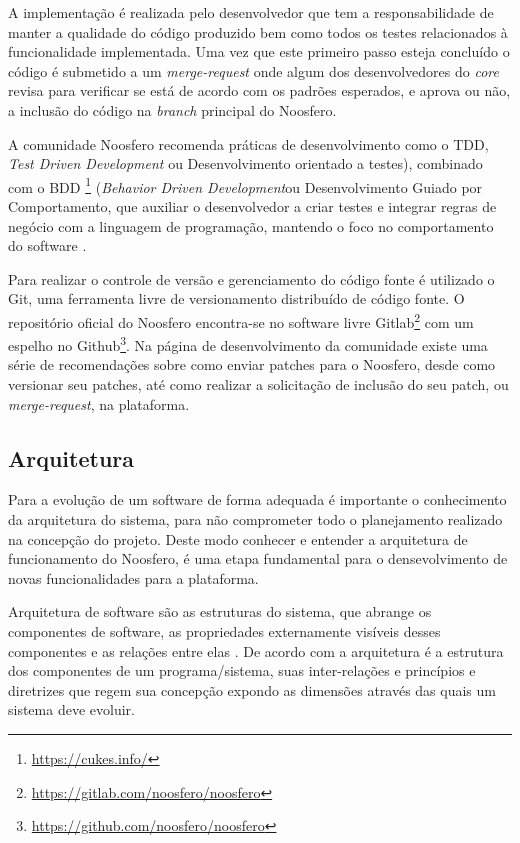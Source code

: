 A implementação é realizada pelo desenvolvedor que tem a responsabilidade de manter a qualidade do código produzido bem como todos os testes relacionados à funcionalidade implementada. Uma vez que este primeiro passo esteja concluído o código é submetido a um \textit{merge-request} onde algum dos desenvolvedores do \textit{core} revisa para verificar se está de acordo com os padrões esperados, e aprova ou não, a inclusão do código na \textit{branch} principal do Noosfero.

A comunidade Noosfero recomenda práticas de desenvolvimento como o TDD, \textit{Test Driven Development} ou Desenvolvimento orientado a testes), combinado com o BDD \footnote{\url{https://cukes.info/}} (\textit{Behavior Driven Development}ou Desenvolvimento Guiado por Comportamento, que auxiliar o desenvolvedor a criar testes e integrar regras de negócio com a linguagem de programação, mantendo o foco no comportamento do software \cite{north2006introducing}.

Para realizar o controle de versão e gerenciamento do código fonte é utilizado o Git, uma ferramenta livre de versionamento distribuído de código fonte. O repositório oficial do Noosfero encontra-se no software livre Gitlab\footnote{\url{https://gitlab.com/noosfero/noosfero}} com um espelho no Github\footnote{\url{https://github.com/noosfero/noosfero}}. Na página de desenvolvimento da comunidade existe uma série de recomendações sobre como enviar patches para o Noosfero, desde como versionar seu patches, até como realizar a solicitação de inclusão do seu patch, ou \textit{merge-request}, na plataforma.

\subsection{Arquitetura}
\label{arquitetura}
Para a evolução de um software de forma adequada é importante o conhecimento da arquitetura do sistema, para não comprometer todo o planejamento realizado na concepção do projeto. Deste modo conhecer e entender a arquitetura de funcionamento do Noosfero, é uma etapa fundamental para o densevolvimento de novas funcionalidades para a plataforma.

Arquitetura de software são as estruturas do sistema, que abrange os componentes de software, as propriedades externamente visíveis desses componentes e as relações entre elas \cite{pressman2011engenharia}. De acordo com  a arquitetura é a estrutura dos componentes de um programa/sistema, suas inter-relações e princípios e diretrizes que regem sua concepção expondo as dimensões através das quais um sistema deve evoluir.

